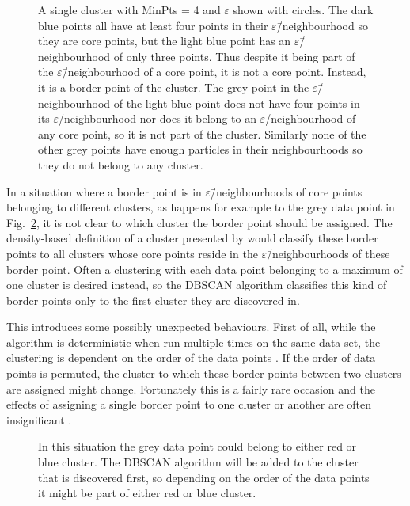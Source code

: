 \documentclass[english, oneside]{HYgradu}
\begin{document}
\begin{figure}
    \centering
    
    \caption{A single cluster with MinPts = 4 and $\varepsilon$ shown with circles. The dark blue points all have at least four points in their $\varepsilon$\=/neighbourhood so they are core points, but the light blue point has an $\varepsilon$\=/neighbourhood of only three points. Thus despite it being part of the $\varepsilon$\=/neighbourhood of a core point, it is not a core point. Instead, it is a border point of the cluster. The grey point in the $\varepsilon$\=/neighbourhood of the light blue point does not have four points in its $\varepsilon$\=/neighbourhood nor does it belong to an $\varepsilon$\=/neighbourhood of any core point, so it is not part of the cluster. Similarly none of the other grey points have enough particles in their neighbourhoods so they do not belong to any cluster.}\label{fig:DBSCAN-borderpoint}
\end{figure}

In a situation where a border point is in $\varepsilon$\=/neighbourhoods of core points belonging to different clusters, as happens for example to the grey data point in Fig.\ \ref{fig:DBSCAN-ambiquity}, it is not clear to which cluster the border point should be assigned. The density-based definition of a cluster presented by \citet{ester1996density} would classify these border points to all clusters whose core points reside in the $\varepsilon$\=/neighbourhoods of these border point. Often a clustering with each data point belonging to a maximum of one cluster is desired instead, so the DBSCAN algorithm classifies this kind of border points only to the first cluster they are discovered in. 

This introduces some possibly unexpected behaviours. First of all, while the algorithm is deterministic when run multiple times on the same data set, the clustering is dependent on the order of the data points \citep{schubert2017dbscan}. If the order of data points is permuted, the cluster to which these border points between two clusters are assigned might change. Fortunately this is a fairly rare occasion and the effects of assigning a single border point to one cluster or another are often insignificant \citep{schubert2017dbscan}.

\begin{figure}
    \centering
    
    \caption{In this situation the grey data point could belong to either red or blue cluster. The DBSCAN algorithm will be added to the cluster that is discovered first, so depending on the order of the data points it might be part of either red or blue cluster.}\label{fig:DBSCAN-ambiquity}
\end{figure}
\end{document}
